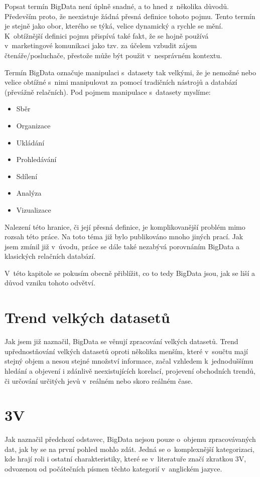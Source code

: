 

Popsat termín BigData není úplně snadné, a to hned z~několika důvodů. Především proto, že neexistuje žádná přesná definice tohoto pojmu. Tento termín je stejně jako obor, kterého se týká, velice dynamický a rychle se mění. K~obtížnější definici pojmu přispívá také fakt, že se hojně používá v~marketingové komunikaci jako tzv.  za účelem vzbudit zájem čtenáře/posluchače, přestože může být použit v~nesprávném kontextu.

Termín BigData označuje manipulaci s~datasety tak velkými, že je nemožné nebo velice obtížné s~nimi manipulovat za pomocí tradičních nástrojů a databází (převážně relačních). Pod pojmem manipulace s~datasety myslíme:

\begin{itemize}
  \item Sběr
  \item Organizace
  \item Ukládání
 \item Prohledávání
 \item Sdílení
 \item Analýza
 \item Vizualizace
\end{itemize}

Nalezení této hranice, či její přesná definice, je komplikovanější problém mimo rozsah této práce. Na toto téma již bylo publikováno mnoho jiných prací. Jak jsem zmínil již v~úvodu, práce se dále také nezabývá porovnáním BigData a klasických relačních databází. 

V~této kapitole se pokusím obecně přiblížit, co to tedy BigData jsou, jak se liší a důvod vzniku tohoto odvětví.


\section{Trend velkých datasetů}
Jak jsem již naznačil, BigData se věnují zpracování velkých datasetů. Trend upřednostňování velkých datasetů oproti několika menším, které v~součtu mají stejný objem a nesou stejné množství informace, začal vzhledem k~jednoduššímu hledání a objevení i zdánlivě neexistujících korelací, projevení obchodních trendů, či určování určitých jevů v~reálném nebo skoro reálném čase. %

\section{3V}
Jak naznačil předchozí odstavec, BigData nejsou pouze o~objemu zpracovávaných dat, jak by se na první pohled mohlo zdát. Jedná se o~komplexnější kategorizaci, kde hrají roli i ostatní charakteristiky, které se v~literatuře značí zkratkou 3V, odvozenou od počátečních písmen těchto kategorií v~anglickém jazyce.

